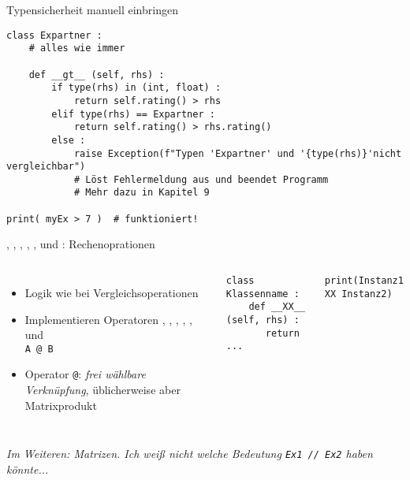 
\begin{frame}[fragile]{Typensicherheit manuell einbringen}
%
\begin{codebox}
\begin{verbatim}
class Expartner :
    # alles wie immer
    
    def __gt__ (self, rhs) :
        if type(rhs) in (int, float) :
            return self.rating() > rhs
        elif type(rhs) == Expartner :
            return self.rating() > rhs.rating()
        else :
            raise Exception(f"Typen 'Expartner' und '{type(rhs)}'nicht vergleichbar")
            # Löst Fehlermeldung aus und beendet Programm
            # Mehr dazu in Kapitel 9

print( myEx > 7 )  # funktioniert!
\end{verbatim}
\end{codebox}
%
\end{frame}


\begin{frame}[fragile]{, , , , ,  und : Rechenoprationen}
%
\begin{columns}[T]
\begin{itemize}
\item Logik wie bei Vergleichsoperationen
\item Implementieren Operatoren , , , , ,  und\\
 \texttt{A @ B}
\item Operator \texttt{@}: \emph{frei wählbare Verknüpfung}, üblicherweise aber Matrixprodukt
\end{itemize}
%
\begin{codebox}
\begin{verbatim}
class Klassenname :
    def __XX__ (self, rhs) :
       return ...
\end{verbatim}
\end{codebox}
%
\begin{codebox}
\begin{verbatim}
print(Instanz1 XX Instanz2)
\end{verbatim}
\end{codebox}
\end{columns}
%
\vspace{6pt}
\emph{Im Weiteren: Matrizen. Ich weiß nicht welche Bedeutung \texttt{Ex1 // Ex2} haben könnte...}
%
\end{frame}

